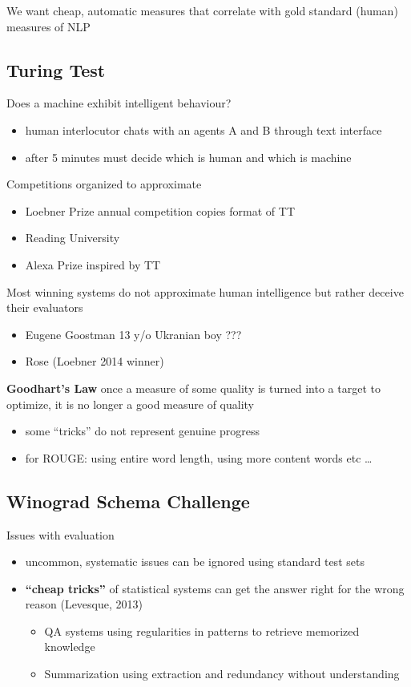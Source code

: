 \documentclass[]{article}
\theoremstyle{definition}
\begin{document}
We want cheap, automatic measures that correlate with gold standard (human) measures of NLP

\subsection{Turing Test}%
\label{sub:turing_test}

Does a machine exhibit intelligent behaviour?
\begin{itemize}
    \item human interlocutor chats with an agents A and B through text interface
    \item after 5 minutes must decide which is human and which is machine
\end{itemize}

Competitions organized to approximate
\begin{itemize}
    \item Loebner Prize annual competition copies format of TT
    \item Reading University
    \item Alexa Prize inspired by TT
\end{itemize}

Most winning systems do not approximate human intelligence but rather deceive their evaluators
\begin{itemize}
    \item Eugene Goostman 13 y/o Ukranian boy ???
    \item Rose (Loebner 2014 winner)
\end{itemize}

\textbf{Goodhart's Law} once a measure of some quality is turned into a target to optimize, it is no longer a good measure of quality
\begin{itemize}
    \item some ``tricks'' do not represent genuine progress
    \item for ROUGE: using entire word length, using more content words etc \ldots
\end{itemize}

\subsection{Winograd Schema Challenge}%
\label{sub:winograd_schema_challenge}

Issues with evaluation
\begin{itemize}
    \item uncommon, systematic issues can be ignored using standard test sets
    \item \textbf{``cheap tricks''} of statistical systems can get the answer right for the wrong reason (Levesque, 2013)
        \begin{itemize}
            \item QA systems using regularities in patterns to retrieve memorized knowledge
            \item Summarization using extraction and redundancy without understanding
        \end{itemize}
\end{itemize}
\end{document}
